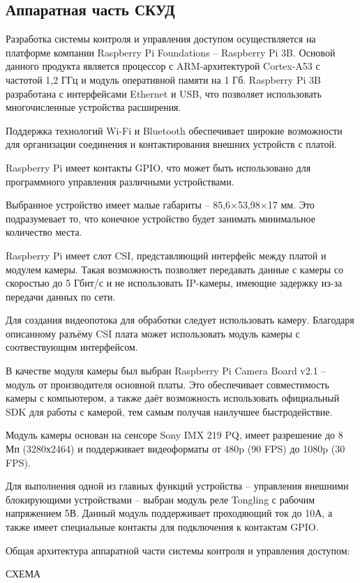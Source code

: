 \subsection{Аппаратная часть СКУД}

Разработка системы контроля и управления доступом осуществляется на платформе компании Raspberry Pi Foundations -- Raspberry Pi 3B. Основой данного продукта является процессор с ARM-архитектурой Cortex-A53 с частотой  1,2 ГГц и модуль оперативной памяти на 1 Гб. Raspberry Pi 3B разработана с интерфейсами Ethernet и USB, что позволяет использовать многочисленные устройства расширения. 

Поддержка технологий Wi-Fi и Bluetooth обеспечивает широкие возможности для организации соединения и контактирования внешних устройств с платой.

Raspberry Pi имеет контакты GPIO, что может быть использовано для программного управления различными устройствами.

Выбранное устройство имеет малые габариты -- 85,6×53,98×17 мм. Это подразумевает то, что конечное устройство будет занимать минимальное количество места.


Raspberry Pi имеет слот CSI, представляющий интерфейс между платой и модулем камеры. Такая возможность позволяет передавать данные с камеры со скоростью до 5 Гбит/с и не использовать IP-камеры, имеющие задержку из-за передачи данных по сети.

Для создания видеопотока для обработки следует использовать камеру. Благодаря описанному разъёму CSI плата может использовать модуль камеры с соотвествующим интерфейсом.

В качестве модуля камеры был выбран Raspberry Pi Camera Board v2.1 -- модуль от производителя основной платы. Это обеспечивает совместимость камеры с компьютером, а также даёт возможность использовать официальный SDK для работы с камерой, тем самым получая наилучшее быстродействие.


Модуль камеры основан на сенсоре Sony IMX 219 PQ, имеет разрешение до 8 Мп (3280х2464) и поддерживает видеоформаты от 480p (90 FPS) до 1080p (30 FPS).

Для выполнения одной из главных функций устройства -- управления внешними блокирующими устройствами -- выбран модуль реле Tongling с рабочим напряжением 5В. Данный модуль поддерживает проходяющий ток до 10А, а также имеет специальные контакты для подключения к контактам GPIO.


Общая архитектура аппаратной части системы контроля и управления доступом:

СХЕМА
